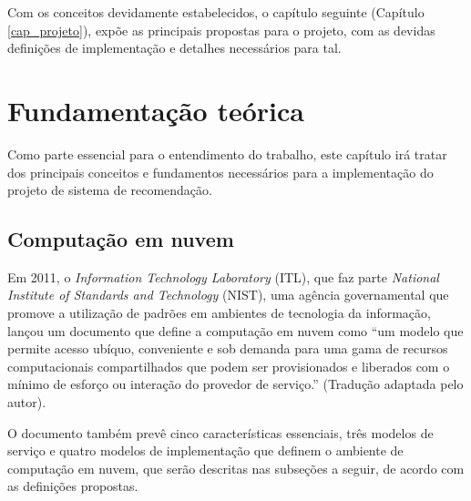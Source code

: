 \documentclass[
	12pt,				%
	openright,			%
	twoside,			%
	a4paper,			%
	english,			%
	french,				%
	spanish,			%
	brazil				%
	]{abntex2}
\begin{document}
Com os conceitos devidamente estabelecidos, o capítulo seguinte (Capítulo \ref{cap_projeto}), expõe as principais propostas para o projeto, com as devidas definições de implementação e detalhes necessários para tal.


\chapter{Fundamentação teórica}\label{cap_conceitos}

Como parte essencial para o entendimento do trabalho, este capítulo irá tratar dos principais conceitos e fundamentos necessários para a implementação do projeto de sistema de recomendação.

\section{Computação em nuvem}\label{sec_comp_nuv}

Em 2011, o \emph{Information Technology Laboratory} (ITL), que faz parte \emph{National Institute of Standards and Technology} (NIST), uma agência governamental que promove a utilização de padrões em ambientes de tecnologia da informação, lançou um documento que define a computação em nuvem como ``um modelo que permite acesso ubíquo, conveniente e sob demanda para uma gama de recursos computacionais compartilhados que podem ser provisionados e liberados com o mínimo de esforço ou interação do provedor de serviço.'' \cite{mell2011nist} (Tradução adaptada pelo autor).

O documento também prevê cinco características essenciais, três modelos de serviço e quatro modelos de implementação que definem o ambiente de computação em nuvem, que serão descritas nas subseções a seguir, de acordo com as definições propostas.
\end{document}
